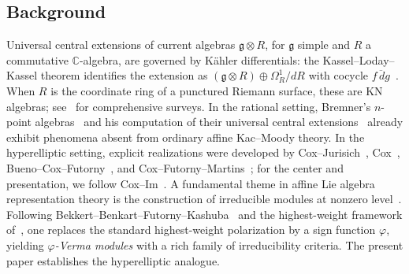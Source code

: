 \documentclass{amsart}
\newcommand{\Cx}{\mathbb{C}}
\newcommand{\g}{\mathfrak{g}}
\newcommand{\ol}{\overline}
\theoremstyle{definition}
\theoremstyle{remark}
\numberwithin{equation}{section}
\begin{document}
\subsection*{Background}
Universal central extensions of current algebras $\g\otimes R$, for
$\g$ simple and $R$ a commutative $\Cx$-algebra, are governed by
K\"ahler differentials: the Kassel--Loday--Kassel theorem identifies the
extension as $(\g\otimes R)\oplus\Omega_R^1/dR$ with cocycle
$\ol{f\,dg}$~\cite{kassel1982extensions,kassel1984kahler}.
When $R$ is the coordinate ring of a punctured Riemann surface, these
are KN algebras; see~\cite{schlichenmaier2014virasoro,schlichenmaier2014} for comprehensive surveys.
In the rational setting, Bremner's $n$-point
algebras~\cite{bremner1995four} and his computation of their universal
central extensions~\cite{bremner1994universal} already exhibit phenomena
absent from ordinary affine Kac--Moody theory.  In the hyperelliptic
setting, explicit realizations were developed by Cox--Jurisich~\cite{Cox:2013aa},
Cox~\cite{cox2008}, Bueno--Cox--Futorny~\cite{Bueno:2009aa}, and
Cox--Futorny--Martins~\cite{Cox:2013ab}; for the center and
presentation, we follow Cox--Im~\cite{cox2017module}.
A fundamental theme in affine Lie algebra representation theory is the
construction of irreducible modules at nonzero
level~\cite{humphreys1972introduction,kac1994infinite,moody1995lie}.
Following Bekkert--Benkart--Futorny--Kashuba~\cite{Bekkert:2011aa}
and the highest-weight framework of~\cite{kacraina}, one replaces
the standard highest-weight polarization by a sign function $\varphi$,
yielding \emph{$\varphi$-Verma modules} with a rich family of
irreducibility criteria.  The present paper establishes the hyperelliptic
analogue.
\end{document}
